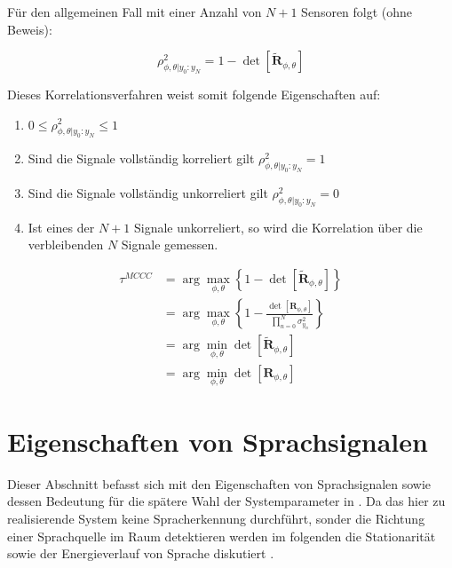 Für den allgemeinen Fall mit einer Anzahl von $N+1$ Sensoren folgt (ohne Beweis):

\begin{equation}
        \rho_{\phi,\theta | y_0 : y_N}^2 = 1 - \det\left [ \mathbf{\tilde R}_{\phi,\theta} \right]
\end{equation}

Dieses Korrelationsverfahren weist somit folgende Eigenschaften auf:

\begin{enumerate}
    \item $0 \leq  \rho_{\phi,\theta | y_0 : y_N}^2 \leq 1$
    \item Sind die Signale vollständig korreliert gilt $ \rho_{\phi,\theta | y_0 : y_N}^2 = 1$
    \item Sind die Signale vollständig unkorreliert gilt $ \rho_{\phi,\theta | y_0 : y_N}^2 = 0$
    \item Ist eines der $N+1$ Signale unkorreliert, so wird die Korrelation über die verbleibenden $N$ Signale gemessen.
\end{enumerate}
\begin{align}
    \tau^{MCCC} & = \arg \max_{\phi,\theta} \left \{ 1 - \det\left [ \mathbf{\tilde R}_{\phi,\theta} \right] \right \} \\
                & = \arg \max_{\phi,\theta} \left \{ 1 - \frac{\det\left [ \mathbf{R}_{\phi,\theta} \right]}{\prod_{n=0}^{N} \sigma_{y_n}^2} \right \} \\
                & = \arg \min_{\phi,\theta} \det\left [\mathbf{\tilde R}_{\phi,\theta} \right] \\
                & = \arg \min_{\phi,\theta} \det\left [\mathbf{R}_{\phi,\theta} \right]
\end{align}




\section{Eigenschaften von Sprachsignalen}
\label{sec:EigenschaftenSprachsignale}
Dieser Abschnitt befasst sich mit den Eigenschaften von Sprachsignalen sowie dessen Bedeutung für die spätere Wahl der Systemparameter in . Da das hier zu realisierende System keine Spracherkennung durchführt, sonder die Richtung einer Sprachquelle im Raum detektieren werden im folgenden die Stationarität sowie der Energieverlauf von Sprache diskutiert \cite[23 f]{Master_Array_Pikora}. 

